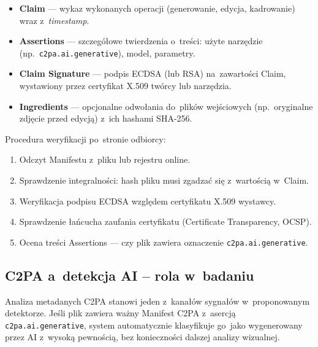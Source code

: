 \begin{itemize}
  \item \textbf{Claim} --- wykaz wykonanych operacji
        (generowanie, edycja, kadrowanie) wraz z~\textit{timestamp}.
  \item \textbf{Assertions} --- szczeg\'{o}\l{}owe twierdzenia
        o~tre\'{s}ci: u\.{z}yte narz\k{e}dzie
        (np.\ \texttt{c2pa.ai.generative}), model, parametry.
  \item \textbf{Claim Signature} --- podpis ECDSA (lub RSA)
        na~zawarto\'{s}ci Claim, wystawiony przez certyfikat
        X.509 tw\'{o}rcy lub narz\k{e}dzia.
  \item \textbf{Ingredients} --- opcjonalne odwo\l{}ania do~plik\'{o}w
        wej\'{s}ciowych (np.\ oryginalne zdj\k{e}cie przed edycj\k{a})
        z~ich hashami SHA-256.
\end{itemize}

Procedura weryfikacji po~stronie odbiorcy:
\begin{enumerate}
  \item Odczyt Manifestu z~pliku lub rejestru online.
  \item Sprawdzenie integralno\'{s}ci: hash pliku musi
        zgadza\'{c} si\k{e} z~warto\'{s}ci\k{a} w~Claim.
  \item Weryfikacja podpisu ECDSA wzgl\k{e}dem
        certyfikatu X.509 wystawcy.
  \item Sprawdzenie \l{}a\'{n}cucha zaufania certyfikatu
        (Certificate Transparency, OCSP).
  \item Ocena tre\'{s}ci Assertions --- czy plik zawiera
        oznaczenie \texttt{c2pa.ai.generative}.
\end{enumerate}

\subsection{C2PA a~detekcja AI -- rola w~badaniu}
\label{sec:c2pa_detekcja}

Analiza metadanych C2PA stanowi jeden z~kana\l{}\'{o}w sygna\l{}\'{o}w
w~proponowanym detektorze.
Je\'{s}li plik zawiera wa\.{z}ny Manifest C2PA z~asercj\k{a}
\texttt{c2pa.ai.generative}, system automatycznie klasyfikuje
go~jako wygenerowany przez AI z~wysok\k{a} pewno\'{s}ci\k{a},
bez konieczno\'{s}ci dalszej analizy wizualnej.

